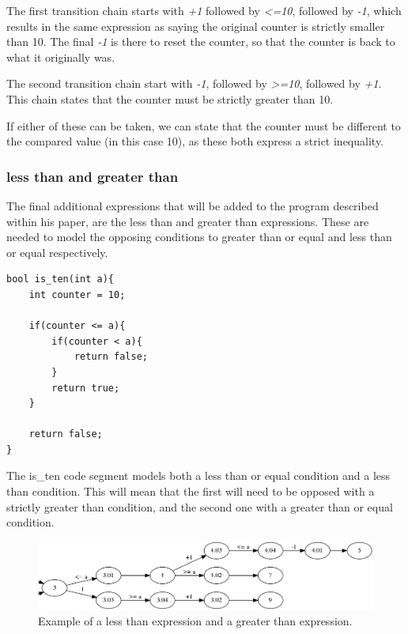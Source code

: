 \documentclass[12pt]{article}
\begin{document}
The first transition chain starts with \textit{+1} followed by \textit{\textless =10}, followed by \textit{-1}, which results in the same expression as saying the original counter is strictly smaller than 10. The final \textit{-1} is there to reset the counter, so that the counter is back to what it originally was. 

The second transition chain start with \textit{-1}, followed by \textit{\textgreater =10}, followed by \textit{+1}. This chain states that the counter must be strictly greater than 10.

If either of these can be taken, we can state that the counter must be different to the compared value (in this case 10), as these both express a strict inequality. 

\subsubsection{less than and greater than}
The final additional expressions that will be added to the program described within his paper, are the less than and greater than expressions. These are needed to model the opposing conditions to greater than or equal and less than or equal respectively.

\begin{lstlisting}[style=CStyle]
bool is_ten(int a){
	int counter = 10;
	
	if(counter <= a){
		if(counter < a){
			return false;
		}
		return true;
	}
	
	return false;
}
\end{lstlisting}

The is\_ten code segment models both a less than or equal condition and a less than condition. This will mean that the first will need to be opposed with a strictly greater than condition, and the second one with a greater than or equal condition.

\begin{figure}[h]
	\centering
	\includegraphics[width=\linewidth]{less_than_greater_than}
	\caption{Example of a less than expression and a greater than expression.}
	\label{fig:less_than_greater_than}
\end{figure}
\end{document}
